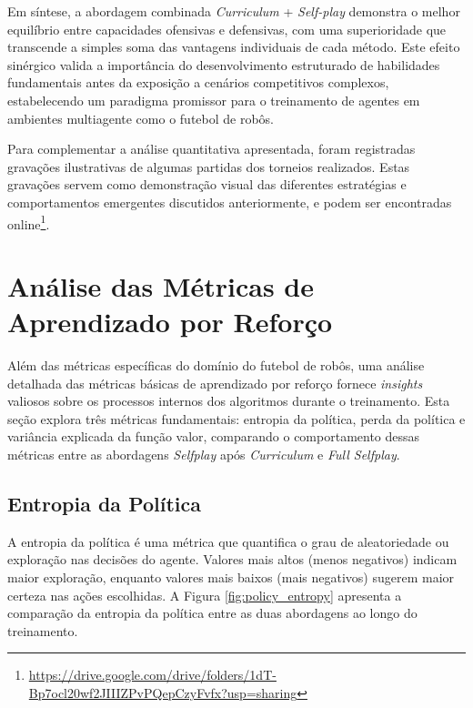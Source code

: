 Em síntese, a abordagem combinada \textit{Curriculum} + \textit{Self-play} demonstra o melhor equilíbrio entre capacidades ofensivas e defensivas, com uma superioridade que transcende a simples soma das vantagens individuais de cada método. Este efeito sinérgico valida a importância do desenvolvimento estruturado de habilidades fundamentais antes da exposição a cenários competitivos complexos, estabelecendo um paradigma promissor para o treinamento de agentes em ambientes multiagente como o futebol de robôs.


Para complementar a análise quantitativa apresentada, foram registradas gravações ilustrativas de algumas partidas dos torneios realizados. Estas gravações servem como demonstração visual das diferentes estratégias e comportamentos emergentes discutidos anteriormente, e podem ser encontradas online\footnote{\url{https://drive.google.com/drive/folders/1dT-Bp7ocl20wf2JIIIZPvPQepCzyFvfx?usp=sharing}}.







\section{Análise das Métricas de Aprendizado por Reforço}
\label{sec:analise_metricas_aprendizado}

Além das métricas específicas do domínio do futebol de robôs, uma análise detalhada das métricas básicas de aprendizado por reforço fornece \textit{insights} valiosos sobre os processos internos dos algoritmos durante o treinamento. Esta seção explora três métricas fundamentais: entropia da política, perda da política e variância explicada da função valor, comparando o comportamento dessas métricas entre as abordagens \textit{Selfplay} após \textit{Curriculum} e \textit{Full Selfplay}.

\subsection{Entropia da Política}

A entropia da política é uma métrica que quantifica o grau de aleatoriedade ou exploração nas decisões do agente. Valores mais altos (menos negativos) indicam maior exploração, enquanto valores mais baixos (mais negativos) sugerem maior certeza nas ações escolhidas. A Figura \ref{fig:policy_entropy} apresenta a comparação da entropia da política entre as duas abordagens ao longo do treinamento.

